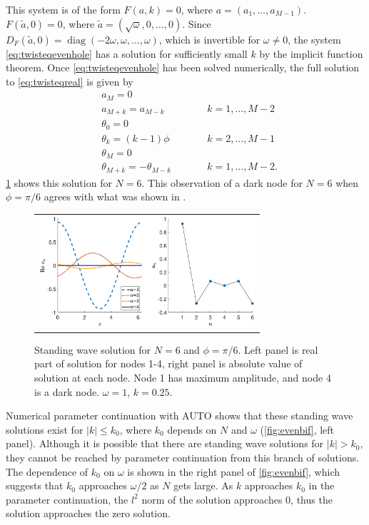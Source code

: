 \documentclass[reprint, amsmath,amssymb,aps]{revtex4-2}
\DeclareMathOperator{\diag}{diag}
\begin{document}
This system is of the form $F(a,k) = 0$, where $a = (a_1, \dots, a_{M-1})$. $F(\tilde{a}, 0) = 0$, where $\tilde{a} = (\sqrt{\omega}, 0, \dots, 0)$. Since $D_F(\tilde{a}, 0) = \diag(-2\omega,\omega, \dots, \omega)$, which is invertible for $\omega \neq 0$, the system \cref{eq:twisteqevenhole} has a solution for sufficiently small $k$ by the implicit function theorem. Once \cref{eq:twisteqevenhole} has been solved numerically, the full solution to \cref{eq:twisteqreal} is given by
\begin{align*}
&a_M = 0 \\
&a_{M+k} = a_{M-k} && \qquad k = 1, \dots, M-2 \\
&\theta_0 = 0 \\
&\theta_k = (k-1)\phi && \qquad  k = 2, \dots, M-1 \\
&\theta_M = 0 \\
&\theta_{M+k} = -\theta_{M-k} && \qquad k = 1, \dots, M-2.
\end{align*}
\cref{fig:evenhole6} shows this solution for $N=6$. This observation of a dark node for $N = 6$ when $\phi = \pi/6$ agrees with what was shown in \cite{castro2016}. 
\begin{figure}
\begin{center}
\begin{tabular}{c}
\includegraphics[width=8cm]{evenhole6.eps}
\end{tabular}
\end{center}
\caption{Standing wave solution for $N = 6$ and $\phi = \pi/6$. Left panel is real part of solution for nodes 1-4, right panel is absolute value of solution at each node. Node 1 has maximum amplitude, and node 4 is a dark node. $\omega = 1$, $k = 0.25$.}
\label{fig:evenhole6}
\end{figure}
Numerical parameter continuation with AUTO shows that these standing wave solutions exist for $|k| \leq k_0$, where $k_0$ depends on $N$ and $\omega$ (\cref{fig:evenbif}, left panel). Although it is possible that there are standing wave solutions for $|k| > k_0$, they cannot be reached by parameter continuation from this branch of solutions. The dependence of $k_0$ on $\omega$ is shown in the right panel of \cref{fig:evenbif}, which suggests that $k_0$ approaches $\omega/2$ as $N$ gets large. As $k$ approaches $k_0$ in the parameter continuation, the $l^2$ norm of the solution approaches 0, thus the solution approaches the zero solution. 
\end{document}
